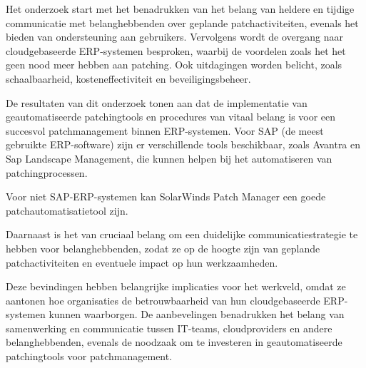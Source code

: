 Het onderzoek start met het benadrukken van het belang van heldere en tijdige communicatie met belanghebbenden over geplande patchactiviteiten, evenals het bieden van ondersteuning aan gebruikers. Vervolgens wordt de overgang naar cloudgebaseerde ERP-systemen besproken, waarbij de voordelen zoals het het geen nood meer hebben aan patching. Ook uitdagingen worden belicht, zoals schaalbaarheid, kosteneffectiviteit en beveiligingsbeheer.

De resultaten van dit onderzoek tonen aan dat de implementatie van geautomatiseerde patchingtools en procedures van vitaal belang is voor een succesvol patchmanagement binnen ERP-systemen. Voor SAP (de meest gebruikte ERP-software) zijn er verschillende tools beschikbaar, zoals Avantra en Sap Landscape Management, die kunnen helpen bij het automatiseren van patchingprocessen. 

Voor niet SAP-ERP-systemen kan SolarWinds Patch Manager een goede patchautomatisatietool zijn.

Daarnaast is het van cruciaal belang om een duidelijke communicatiestrategie te hebben voor belanghebbenden, zodat ze op de hoogte zijn van geplande patchactiviteiten en eventuele impact op hun werkzaamheden.

Deze bevindingen hebben belangrijke implicaties voor het werkveld, omdat ze aantonen hoe organisaties de betrouwbaarheid van hun cloudgebaseerde ERP-systemen kunnen waarborgen. De aanbevelingen benadrukken het belang van samenwerking en communicatie tussen IT-teams, cloudproviders en andere belanghebbenden, evenals de noodzaak om te investeren in geautomatiseerde patchingtools voor patchmanagement.